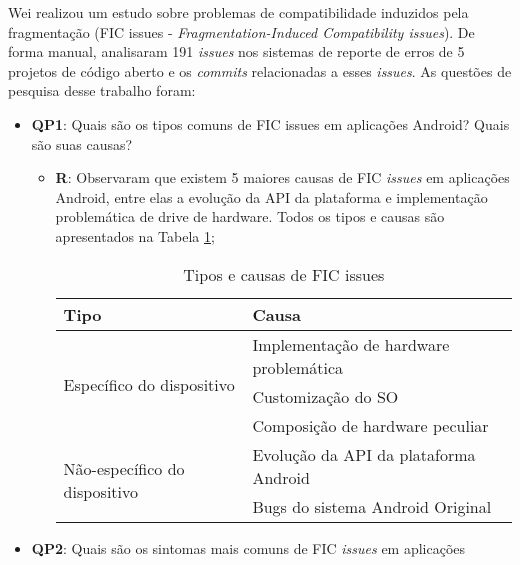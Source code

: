Wei \cite{Wei2016} realizou um estudo sobre problemas de compatibilidade induzidos
pela fragmentação 
(FIC issues - \textit{Fragmentation-Induced Compatibility issues}).
De forma manual, analisaram 191 \textit{issues} nos sistemas de reporte de erros
de 5 projetos de código aberto e os \textit{commits} relacionadas a esses \textit{issues}.
As questões de pesquisa desse trabalho foram:
\begin{itemize}
	\item \textbf{QP1}: Quais são os tipos comuns de FIC issues em aplicações
	Android? Quais são suas causas?
	    \begin{itemize}
	        \item \textbf{R}: Observaram que existem 5 maiores causas de FIC \textit{issues}
	        em aplicações Android, entre elas a evolução da API da plataforma e implementação
	        problemática de drive de hardware. Todos os tipos e causas são apresentados
	        na Tabela \ref{tab:causas_FIC};
	        \begin{table}[h] %
              \centering
              \caption{Tipos e causas de FIC issues \cite{Wei2016}}
              \begin{tabular}{ | l | l |}
                \hline %
                \textbf{Tipo} & \textbf{Causa}  \\ \hline
                \multirow{3}{*}{Específico do dispositivo} & Implementação de hardware problemática   \\ \cline{2-2}
                                                         & Customização do SO \\ \cline{2-2}
                                                         & Composição de hardware peculiar \\ \hline
                \multirow{2}{*}{Não-específico do dispositivo} & Evolução da API da plataforma Android \\ \cline{2-2}
                                                             & Bugs do sistema Android Original \\ \hline
              \end{tabular}
              \label{tab:causas_FIC}
            \end{table}
	    \end{itemize}
	\item \textbf{QP2}: Quais são os sintomas mais comuns de FIC \textit{issues} em aplicações

\end{itemize}
